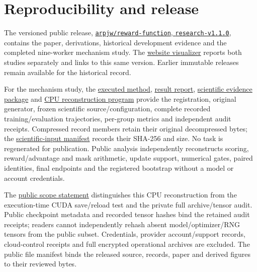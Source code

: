 \documentclass[11pt]{article}
\begin{document}
\section{Reproducibility and release}

The versioned public release, \href{https://github.com/arpjw/reward-function/tree/research-v1.1.0}{\texttt{arpjw/reward-function}, \texttt{research-v1.1.0}}, contains the paper, derivations, historical development evidence and the completed nine-worker mechanism study. The \href{https://aryasomu.com/papers/reward-contrast/}{website visualizer} reports both studies separately and links to this same version. Earlier immutable releases remain available for the historical record.

For the mechanism study, the \href{https://github.com/arpjw/reward-function/blob/research-v1.1.0/docs/REWARD_MECHANISM_METHOD.md}{executed method}, \href{https://github.com/arpjw/reward-function/blob/research-v1.1.0/docs/REWARD_MECHANISM_RESULTS.md}{result report}, \href{https://github.com/arpjw/reward-function/blob/research-v1.1.0/baselines/reward-mechanism-2026-10-11/README.md}{scientific evidence package} and \href{https://github.com/arpjw/reward-function/blob/research-v1.1.0/analyze_reward_mechanism_public.py}{CPU reconstruction program} provide the registration, original generator, frozen scientific source/configuration, complete recorded training/evaluation trajectories, per-group metrics and independent audit receipts. Compressed record members retain their original decompressed bytes; the \href{https://github.com/arpjw/reward-function/blob/research-v1.1.0/baselines/reward-mechanism-2026-10-11/SCIENTIFIC_INPUTS.json}{scientific-input manifest} records their SHA-256 and size. No task is regenerated for publication. Public analysis independently reconstructs scoring, reward/advantage and mask arithmetic, update support, numerical gates, paired identities, final endpoints and the registered bootstrap without a model or account credentials.

The \href{https://github.com/arpjw/reward-function/blob/research-v1.1.0/PUBLIC_SCOPE.md}{public scope statement} distinguishes this CPU reconstruction from the execution-time CUDA save/reload test and the private full archive/tensor audit. Public checkpoint metadata and recorded tensor hashes bind the retained audit receipts; readers cannot independently rehash absent model/optimizer/RNG tensors from the public subset. Credentials, provider account/support records, cloud-control receipts and full encrypted operational archives are excluded. The public file manifest binds the released source, records, paper and derived figures to their reviewed bytes.
\end{document}
